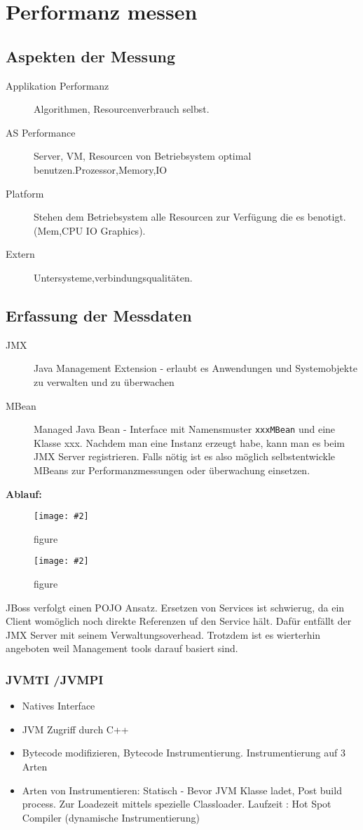 \documentclass[a4paper,10pt]{scrreprt}
\newcommand{\pic}[2][figure]{\begin{figure}[h]
 \centering
 \texttt{[image: \#2]}
 \caption{#1}
\end{figure}
}
\begin{document}
\chapter{Performanz messen} %
\label{cha:performanz_messen}
\section{Aspekten der Messung} %
\label{sec:aspekten_der_messung}
\begin{description}
	\item[Applikation Performanz] Algorithmen, Resourcenverbrauch selbst.
	\item[AS Performance] Server, VM, Resourcen von Betriebsystem optimal benutzen.Prozessor,Memory,IO 
	\item[Platform] Stehen dem Betriebsystem alle Resourcen zur Verfügung die es benotigt. (Mem,CPU IO  Graphics).
	\item[Extern] Untersysteme,verbindungsqualitäten.
\end{description}
\section{Erfassung der Messdaten} %
\label{sec:erfassung_der_messdaten}
\begin{description}
	\item[JMX] Java Management Extension - erlaubt es Anwendungen und Systemobjekte zu verwalten  und zu überwachen
	\item[MBean] Managed Java Bean - Interface mit Namensmuster \texttt{xxxMBean} und eine Klasse xxx. Nachdem man eine Instanz erzeugt habe, kann man es beim JMX Server registrieren.  Falls nötig ist es also möglich selbstentwickle MBeans zur Performanzmessungen oder überwachung einsetzen.
\end{description}

\textbf{Ablauf:}
\pic{jmxabl.png}
\pic{jmx2.png}

JBoss verfolgt einen POJO Ansatz.  Ersetzen von Services ist schwierug, da ein Client womöglich noch direkte Referenzen uf den Service hält. Dafür entfällt der JMX Server mit seinem Verwaltungsoverhead. Trotzdem ist es wierterhin angeboten weil Management tools darauf basiert sind.

\subsection{JVMTI /JVMPI} %
\label{sub:jvmt}
\begin{itemize}
	\item Natives Interface
	\item JVM Zugriff durch C++
	\item Bytecode modifizieren, Bytecode Instrumentierung.
	\subitem Instrumentierung auf 3 Arten
	\item Arten von Instrumentieren:
	\subitem Statisch - Bevor JVM Klasse ladet, Post build process.
	\subitem Zur Loadezeit mittels spezielle Classloader.
	\subitem Laufzeit : Hot Spot Compiler (dynamische Instrumentierung)
\end{itemize}
\end{document}
